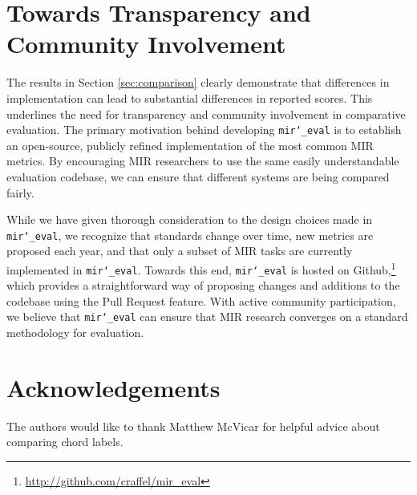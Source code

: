 \documentclass{article}
\def\mireval{\texttt{mir\char`_eval}}
\begin{document}
\section{Towards Transparency and Community Involvement}
\label{sec:discussion}

The results in Section \ref{sec:comparison} clearly demonstrate that differences in implementation can lead to substantial differences in reported scores.
This underlines the need for transparency and community involvement in comparative evaluation.
The primary motivation behind developing \mireval{} is to establish an open-source, publicly refined implementation of the most common MIR metrics.
By encouraging MIR researchers to use the same easily understandable evaluation codebase, we can ensure that different systems are being compared fairly.

While we have given thorough consideration to the design choices made in \mireval{}, we recognize that standards change over time, new metrics are proposed each year, and that only a subset of MIR tasks are currently implemented in \mireval{}.
Towards this end, \mireval{} is hosted on Github,\footnote{\url{http://github.com/craffel/mir_eval}} which provides a straightforward way of proposing changes and additions to the codebase using the Pull Request feature.
With active community participation, we believe that \mireval{} can ensure that MIR research converges on a standard methodology for evaluation.

\section{Acknowledgements}

The authors would like to thank Matthew McVicar for helpful advice about comparing chord labels.


\end{document}
